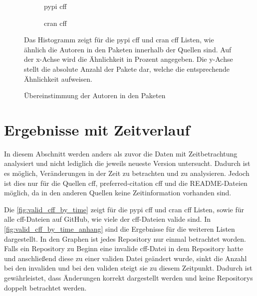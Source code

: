 \begin{figure}
    \begin{subfigure}{.5\textwidth}
        \centering
        
        \caption{\gls{pypi} \gls{cff}}
        \label{fig:similarity_pypi_cff}
    \end{subfigure}%
    \begin{subfigure}{.5\textwidth}
        \centering
        
        \caption{\gls{cran} \gls{cff}}
        \label{fig:similarity_cran_cff}
    \end{subfigure}
    \caption{Übereinstimmung der Autoren in den Paketen}
    \label{fig:similarities}
    \small
    Das Histogramm zeigt für die \gls{pypi} \gls{cff} und \gls{cran} \gls{cff} Listen, wie ähnlich die Autoren in den Paketen innerhalb der Quellen sind. Auf der x-Achse wird die Ähnlichkeit in Prozent angegeben. Die y-Achse stellt die absolute Anzahl der Pakete dar, welche die entsprechende Ähnlichkeit aufweisen.
\end{figure}

\section{Ergebnisse mit Zeitverlauf}
\label{sec:gesamtheit_ergebnisse}
In diesem Abschnitt werden anders als zuvor die Daten mit Zeitbetrachtung analysiert und nicht lediglich die jeweils neueste Version untersucht.
Dadurch ist es möglich, Veränderungen in der Zeit zu betrachten und zu analysieren.
Jedoch ist dies nur für die Quellen \gls{cff}, \glqq preferred-citation\grqq{} \gls{cff} und die README-Dateien möglich, da in den anderen Quellen keine Zeitinformation vorhanden sind.

Die \autoref{fig:valid_cff_by_time} zeigt für die \gls{pypi} \gls{cff} und \gls{cran} \gls{cff} Listen, sowie für alle \gls{cff}-Dateien auf GitHub, wie viele der \gls{cff}-Dateien valide sind.
In \autoref{fig:valid_cff_by_time_anhang} sind die Ergebnisse für die weiteren Listen dargestellt.
In den Graphen ist jedes Repository nur einmal betrachtet worden.
Falls ein Repository zu Beginn eine invalide \gls{cff}-Datei in dem Repository hatte und anschließend diese zu einer validen Datei geändert wurde, sinkt die Anzahl bei den invaliden und bei den validen steigt sie zu diesem Zeitpunkt.
Dadurch ist gewährleistet, dass Änderungen korrekt dargestellt werden und keine Repositorys doppelt betrachtet werden.

